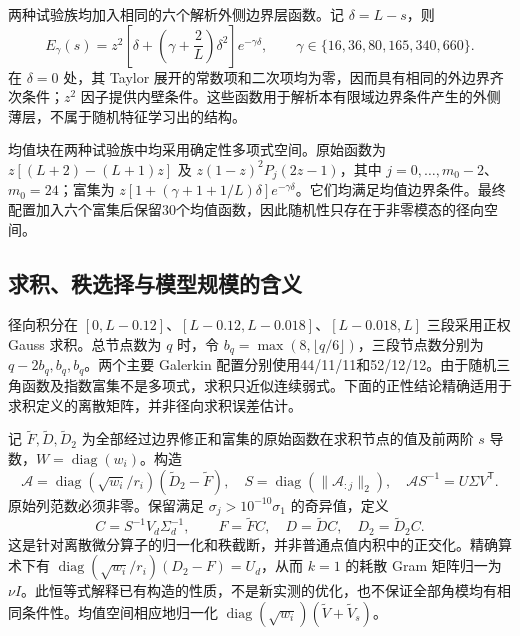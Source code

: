 两种试验族均加入相同的六个解析外侧边界层函数。记 \(\delta=L-s\)，则
\begin{equation}
 E_\gamma(s)=z^2\left[\delta+
       \left(\gamma+\frac{2}{L}\right)\delta^2\right]e^{-\gamma\delta},
 \qquad \gamma\in\{16,36,80,165,340,660\}.
 \label{eq:layer-features}
\end{equation}
在 \(\delta=0\) 处，其 Taylor 展开的常数项和二次项均为零，因而具有相同的外边界齐次条件；\(z^2\) 因子提供内壁条件。这些函数用于解析本有限域边界条件产生的外侧薄层，不属于随机特征学习出的结构。

均值块在两种试验族中均采用确定性多项式空间。原始函数为 \(z[(L+2)-(L+1)z]\) 及 \(z(1-z)^2P_j(2z-1)\)，其中 \(j=0,\ldots,m_0-2\)、\(m_0=24\)；富集为 \(z[1+(\gamma+1+1/L)\delta]e^{-\gamma\delta}\)。它们均满足均值边界条件。最终配置加入六个富集后保留30个均值函数，因此随机性只存在于非零模态的径向空间。

\subsection{求积、秩选择与模型规模的含义}

径向积分在 \([0,L-0.12]\)、\([L-0.12,L-0.018]\)、\([L-0.018,L]\) 三段采用正权 Gauss 求积。总节点数为 \(q\) 时，令 \(b_q=\max(8,\lfloor q/6\rfloor)\)，三段节点数分别为 \(q-2b_q,b_q,b_q\)。两个主要 Galerkin 配置分别使用44/11/11和52/12/12。由于随机三角函数及指数富集不是多项式，求积只近似连续弱式。下面的正性结论精确适用于求积定义的离散矩阵，并非径向求积误差估计。

记 \(\widetilde F,\widetilde D,\widetilde D_2\) 为全部经过边界修正和富集的原始函数在求积节点的值及前两阶 \(s\) 导数，\(W=\operatorname{diag}(w_i)\)。构造
\begin{equation}
 \mathcal A=\operatorname{diag}(\sqrt{w_i}/r_i)
       (\widetilde D_2-\widetilde F),\quad
 S=\operatorname{diag}(\|\mathcal A_{:j}\|_2),\quad
 \mathcal A S^{-1}=U\Sigma V^{\mathsf T}.
 \label{eq:feature-svd}
\end{equation}
原始列范数必须非零。保留满足 \(\sigma_j>10^{-10}\sigma_1\) 的奇异值，定义
\begin{equation}
 C=S^{-1}V_d\Sigma_d^{-1},\qquad
 F=\widetilde FC,\quad D=\widetilde DC,\quad D_2=\widetilde D_2C.
 \label{eq:feature-transform}
\end{equation}
这是针对离散微分算子的归一化和秩截断，并非普通点值内积中的正交化。精确算术下有 \(\operatorname{diag}(\sqrt{w_i}/r_i)(D_2-F)=U_d\)，从而 \(k=1\) 的耗散 Gram 矩阵归一为 \(\nu I\)。此恒等式解释已有构造的性质，不是新实测的优化，也不保证全部角模均有相同条件性。均值空间相应地归一化 \(\operatorname{diag}(\sqrt{w_i})(\widetilde V+\widetilde V_s)\)。

